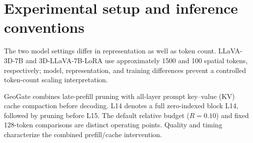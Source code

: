 \section{Experimental setup and inference conventions}
\label{sec:supp_protocols}
The two model settings differ in representation as well as token count. LLaVA-3D-7B and 3D-LLaVA-7B-LoRA use approximately 1500 and 100 spatial tokens, respectively; model, representation, and training differences prevent a controlled token-count scaling interpretation.

GeoGate combines late-prefill pruning with all-layer prompt key--value (KV) cache compaction before decoding. L14 denotes a full zero-indexed block L14, followed by pruning before L15. The default relative budget ($R=0.10$) and fixed 128-token comparisons are distinct operating points. Quality and timing characterize the combined prefill/cache intervention.


